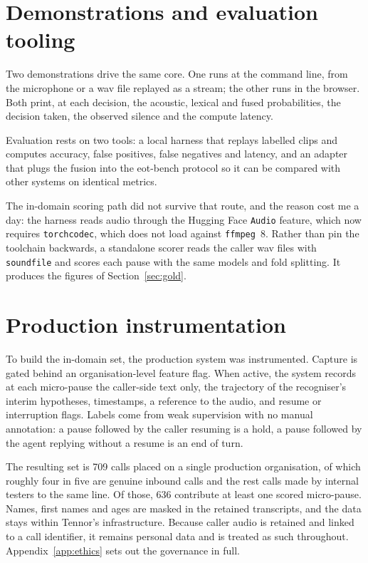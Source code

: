 \section{Demonstrations and evaluation tooling}
\label{sec:tooling}

Two demonstrations drive the same core. One runs at the command line, from the microphone or
a wav file replayed as a stream; the other runs in the browser. Both print, at each
decision, the acoustic, lexical and fused probabilities, the decision taken, the observed
silence and the compute latency.

Evaluation rests on two tools: a local harness that replays labelled clips and computes
accuracy, false positives, false negatives and latency, and an adapter that plugs the fusion
into the eot-bench protocol so it can be compared with other systems on identical metrics.

The in-domain scoring path did not survive that route, and the reason cost me a day: the
harness reads audio through the Hugging Face \texttt{Audio} feature, which now requires
\texttt{torchcodec}, which does not load against \texttt{ffmpeg}~8. Rather than pin the
toolchain backwards, a standalone scorer reads the caller wav files with \texttt{soundfile}
and scores each pause with the same models and fold splitting. It produces the figures of
Section~\ref{sec:gold}.

\section{Production instrumentation}
\label{sec:instrumentation}

To build the in-domain set, the production system was instrumented. Capture is gated behind
an organisation-level feature flag. When active, the system records at each micro-pause the
caller-side text only, the trajectory of the recogniser's interim hypotheses, timestamps, a
reference to the audio, and resume or interruption flags. Labels come from weak supervision
with no manual annotation: a pause followed by the caller resuming is a hold, a pause
followed by the agent replying without a resume is an end of turn.

The resulting set is 709 calls placed on a single production organisation, of which roughly
four in five are genuine inbound calls and the rest calls made by internal testers to the
same line. Of those, 636 contribute at least one scored micro-pause.
Names, first names and ages are masked in the retained transcripts, and the data stays
within Tennor's infrastructure. Because caller audio is retained and linked to a call identifier, it remains
personal data and is treated as such throughout. Appendix~\ref{app:ethics} sets out the
governance in full.

